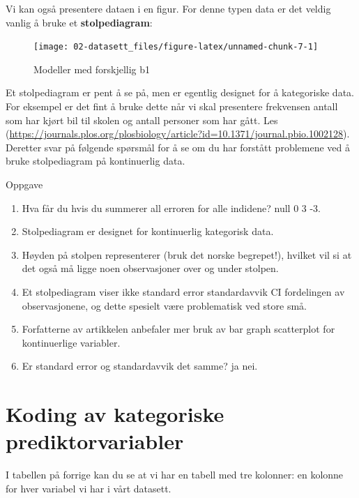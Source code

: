 \documentclass[
]{book}
\begin{document}
Vi kan også presentere dataen i en figur. For denne typen data er det veldig vanlig å bruke et \textbf{stolpediagram}:

\begin{figure}

{\centering \texttt{[image: 02-datasett\_files/figure-latex/unnamed-chunk-7-1]} 

}

\caption{Modeller med forskjellig b1}\label{fig:unnamed-chunk-7}
\end{figure}

Et stolpediagram er pent å se på, men er egentlig designet for å kategoriske data. For eksempel er det fint å bruke dette når vi skal presentere frekvensen antall som har kjørt bil til skolen og antall personer som har gått. Les \citep{weissgerber_beyond_2015}(\url{https://journals.plos.org/plosbiology/article?id=10.1371/journal.pbio.1002128}). Deretter svar på følgende spørsmål for å se om du har forstått problemene ved å bruke stolpediagram på kontinuerlig data.

{Oppgave}

\begin{enumerate}
\def\labelenumi{\alph{enumi}.}
\setcounter{enumi}{1}
\item
  Hva får du hvis du summerer all erroren for alle indidene? null 0 3 -3.
\item
  Stolpediagram er designet for kontinuerlig kategorisk data.
\item
  Høyden på stolpen representerer (bruk det norske begrepet!), hvilket vil si at det også må ligge noen observasjoner over og under stolpen.
\item
  Et stolpediagram viser ikke standard error standardavvik CI fordelingen av observasjonene, og dette spesielt være problematisk ved store små.
\item
  Forfatterne av artikkelen anbefaler mer bruk av bar graph scatterplot for kontinuerlige variabler.
\item
  Er standard error og standardavvik det samme? ja nei.
\end{enumerate}

\hypertarget{koding-av-kategoriske-prediktorvariabler}{%
\chapter{Koding av kategoriske prediktorvariabler}\label{koding-av-kategoriske-prediktorvariabler}}

I tabellen på forrige kan du se at vi har en tabell med tre kolonner: en kolonne for hver variabel vi har i vårt datasett.
\end{document}
